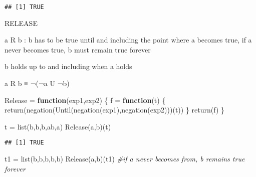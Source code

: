 \documentclass[
]{article}
\newenvironment{Shaded}{\begin{snugshade}}{\end{snugshade}}
\newcommand{\CommentTok}[1]{\textcolor[rgb]{0.56,0.35,0.01}{\textit{#1}}}
\newcommand{\ControlFlowTok}[1]{\textcolor[rgb]{0.13,0.29,0.53}{\textbf{#1}}}
\newcommand{\FunctionTok}[1]{\textcolor[rgb]{0.00,0.00,0.00}{#1}}
\newcommand{\NormalTok}[1]{#1}
\newcommand{\OtherTok}[1]{\textcolor[rgb]{0.56,0.35,0.01}{#1}}
\newcommand{\StringTok}[1]{\textcolor[rgb]{0.31,0.60,0.02}{#1}}
\begin{document}
\begin{verbatim}
## [1] TRUE
\end{verbatim}

RELEASE

a R b : b has to be true until and including the point where a becomes
true, if a never becomes true, b must remain true forever

b holds up to and including when a holds

a R b ≡ ¬(¬a U ¬b)

\begin{Shaded}
\begin{Highlighting}[]
\NormalTok{Release }\OtherTok{=} \ControlFlowTok{function}\NormalTok{(exp1,exp2)}
\NormalTok{\{}
\NormalTok{  f }\OtherTok{=} \ControlFlowTok{function}\NormalTok{(t)}
\NormalTok{  \{}
    \FunctionTok{return}\NormalTok{(}\FunctionTok{negation}\NormalTok{(}\FunctionTok{Until}\NormalTok{(}\FunctionTok{negation}\NormalTok{(exp1),}\FunctionTok{negation}\NormalTok{(exp2)))(t))}
\NormalTok{  \}}
  \FunctionTok{return}\NormalTok{(f)}
\NormalTok{\}}

\NormalTok{t }\OtherTok{=} \FunctionTok{list}\NormalTok{(}\StringTok{\textquotesingle{}b\textquotesingle{}}\NormalTok{,}\StringTok{\textquotesingle{}b\textquotesingle{}}\NormalTok{,}\StringTok{\textquotesingle{}b\textquotesingle{}}\NormalTok{,}\StringTok{\textquotesingle{}ab\textquotesingle{}}\NormalTok{,}\StringTok{\textquotesingle{}a\textquotesingle{}}\NormalTok{)}
\FunctionTok{Release}\NormalTok{(a,b)(t)}
\end{Highlighting}
\end{Shaded}

\begin{verbatim}
## [1] TRUE
\end{verbatim}

\begin{Shaded}
\begin{Highlighting}[]
\NormalTok{t1 }\OtherTok{=} \FunctionTok{list}\NormalTok{(}\StringTok{\textquotesingle{}b\textquotesingle{}}\NormalTok{,}\StringTok{\textquotesingle{}b\textquotesingle{}}\NormalTok{,}\StringTok{\textquotesingle{}b\textquotesingle{}}\NormalTok{,}\StringTok{\textquotesingle{}b\textquotesingle{}}\NormalTok{,}\StringTok{\textquotesingle{}b\textquotesingle{}}\NormalTok{)}
\FunctionTok{Release}\NormalTok{(a,b)(t1) }\CommentTok{\#if a never becomes from, b remains true forever }
\end{Highlighting}
\end{Shaded}
\end{document}
